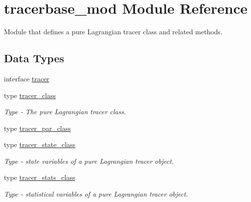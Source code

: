 \hypertarget{namespacetracerbase__mod}{}\section{tracerbase\+\_\+mod Module Reference}
\label{namespacetracerbase__mod}


Module that defines a pure Lagrangian tracer class and related methods.  


\subsection*{Data Types}
\begin{DoxyCompactItemize}
\item 
interface \mbox{\hyperlink{interfacetracerbase__mod_1_1tracer}{tracer}}
\item 
type \mbox{\hyperlink{structtracerbase__mod_1_1tracer__class}{tracer\+\_\+class}}
\begin{DoxyCompactList}\small\item\em Type -\/ The pure Lagrangian tracer class. \end{DoxyCompactList}\item 
type \mbox{\hyperlink{structtracerbase__mod_1_1tracer__par__class}{tracer\+\_\+par\+\_\+class}}
\item 
type \mbox{\hyperlink{structtracerbase__mod_1_1tracer__state__class}{tracer\+\_\+state\+\_\+class}}
\begin{DoxyCompactList}\small\item\em Type -\/ state variables of a pure Lagrangian tracer object. \end{DoxyCompactList}\item 
type \mbox{\hyperlink{structtracerbase__mod_1_1tracer__stats__class}{tracer\+\_\+stats\+\_\+class}}
\begin{DoxyCompactList}\small\item\em Type -\/ statistical variables of a pure Lagrangian tracer object. \end{DoxyCompactList}\end{DoxyCompactItemize}
